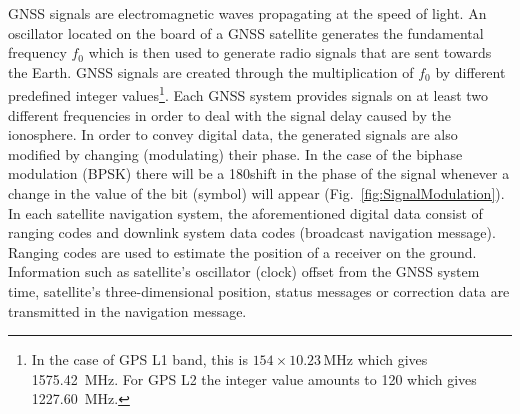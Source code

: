 GNSS signals are electromagnetic waves propagating at the speed of light. An oscillator located on the board of a GNSS satellite generates the fundamental 
frequency $f_0$ which is then used to generate radio signals that are sent 
towards the Earth. GNSS signals are created through the multiplication of $f_0$ by different predefined integer values\footnote{In the case of GPS L1 band, this is $154 \times 10.23\,\textrm{MHz}$ 
which gives 1575.42~MHz. For GPS L2 the integer value amounts to 120 which gives 1227.60~MHz.}. Each GNSS system provides signals on at least two different frequencies in 
order to deal with the signal delay caused by the ionosphere. In order to convey digital data, the generated signals are also modified by changing (modulating) their 
phase. In the case of the biphase modulation (BPSK) there will be a 180\deg shift in the phase of the signal whenever a change in the value of the bit (symbol) will appear (Fig.~\ref{fig:SignalModulation}).
In each satellite 
navigation system, the aforementioned digital data consist of ranging codes and downlink system data codes (broadcast navigation message). Ranging codes are used to estimate 
the position of a receiver on the ground. Information such as satellite's oscillator (clock) offset from the GNSS system time, satellite's three-dimensional position, status 
messages or correction data are transmitted in the navigation message.\par{}


